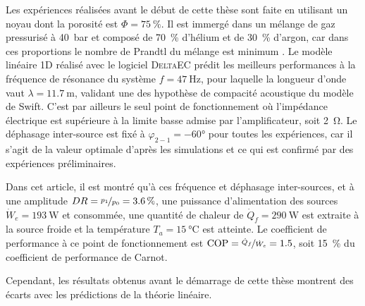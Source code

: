 Les expériences réalisées avant le début de cette thèse sont faite en utilisant un noyau dont la porosité est $\Phi=\qty{75}{\percent}$. Il est immergé dans un mélange de gaz pressurisé à \qty{40}{\bar} et composé de \qty{70}{\percent} d'hélium et de \qty{30}{\percent} d'argon, car dans ces proportions le nombre de Prandtl du mélange est minimum \cite{belcher_working_1999}. Le modèle linéaire 1D réalisé avec le logiciel  \textsc{DeltaEC} prédit les meilleurs performances à la fréquence de résonance du système $f=\qty{47}{\hertz}$, pour laquelle la longueur d'onde vaut $\lambda=\qty{11.7}{\meter}$, validant une des hypothèse de compacité acoustique du modèle de Swift. C'est par ailleurs le seul point de fonctionnement où l'impédance électrique est supérieure à la limite basse admise par l'amplificateur, soit \qty{2}{\ohm}. Le déphasage inter-source est fixé à $\varphi_{2-1}=\ang{-60}$ pour toutes les expériences, car il s'agit de la valeur optimale d'après les simulations et ce qui est confirmé par des expériences préliminaires.

Dans cet article, il est montré qu'à ces fréquence et déphasage inter-sources, et à une amplitude $DR=\nicefrac{p_1}{p_0}=\qty{3.6}{\percent}$, une puissance d'alimentation des sources $\dot W_e=\qty{193}{\watt}$ et consommée, une quantité de chaleur de $\dot Q_f=\qty{290}{\watt}$ est extraite à la source froide et la température $T_a=\qty{15}{\degreeCelsius}$ est atteinte. Le coefficient de performance à ce point de fonctionnement est $\mathrm{COP}=\nicefrac{\dot Q_f}{\dot W_e}=\num{1.5}$, soit \qty{15}{\percent} du coefficient de performance de Carnot.\smallskip

Cependant, les résultats obtenus avant le démarrage de cette thèse montrent des écarts avec les prédictions de la théorie linéaire.

